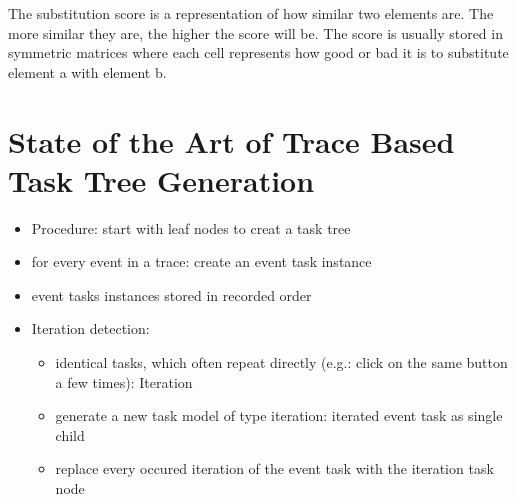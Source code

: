 The substitution score is a representation of how similar two elements are. The more similar they are, the higher the score will be.
The score is usually stored in symmetric matrices where each cell represents how good or bad it is to substitute element a with element b. 
\begin{figure}
	\label{fig:submatexample}
\end{figure}

\section{State of the Art of Trace Based Task Tree Generation}
\begin{itemize}
	\item Procedure: start with leaf nodes to creat a task tree
 	\item for every event in a trace: create an event task instance
  	\item event tasks instances stored in recorded order

	\item Iteration detection:
	\begin{itemize} 
		\item identical tasks, which often repeat directly (e.g.: click on the same button a few times): Iteration
		\item generate a new task model of type iteration: iterated event task as single child
		\item replace every occured iteration of the event task with the iteration task node 
	\end{itemize}


\end{itemize}
